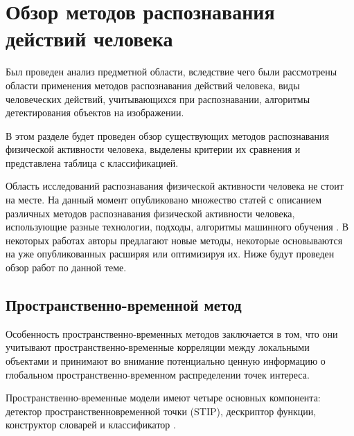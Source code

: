 \section{Обзор методов распознавания действий человека}	
Был проведен анализ предметной области, вследствие чего были рассмотрены области применения методов распознавания действий человека, виды человеческих действий, учитывающихся при распознавании, алгоритмы детектирования объектов на изображении.

В этом разделе будет проведен обзор существующих методов распознавания физической активности человека, выделены критерии их сравнения и представлена таблица с классификацией.

Область исследований распознавания физической активности человека не стоит на месте.
На данный момент опубликовано множество статей с описанием различных методов распознавания физической активности человека, использующие разные  технологии, подходы, алгоритмы машинного обучения . В некоторых работах авторы предлагают новые методы, некоторые основываются на уже опубликованных расширяя или оптимизируя их.
Ниже будут проведен обзор работ по данной теме.
\subsection{Пространственно-временной метод}

Особенность пространственно-временных методов заключается в том, что они учитывают пространственно-временные корреляции между локальными объектами и принимают во внимание потенциально ценную информацию о глобальном пространственно-временном распределении точек интереса.

Пространственно-временные
модели имеют четыре основных компонента: детектор пространственновременной точки (STIP), дескриптор функции, конструктор словарей и
классификатор \cite{teorytime}. 




